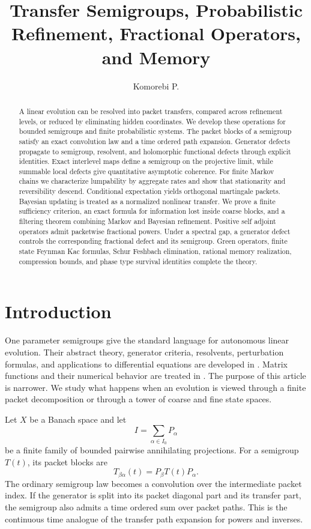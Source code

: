 \documentclass{aomart}
\title[Transfer semigroups and memory]{Transfer Semigroups, Probabilistic Refinement, Fractional Operators, and Memory}
\author[Komorebi P.]{Komorebi P.}
\theoremstyle{definition}
\theoremstyle{remark}
\begin{document}
\begin{abstract}
A linear evolution can be resolved into packet transfers, compared across refinement levels, or reduced by eliminating hidden coordinates. We develop these operations for bounded semigroups and finite probabilistic systems. The packet blocks of a semigroup satisfy an exact convolution law and a time ordered path expansion. Generator defects propagate to semigroup, resolvent, and holomorphic functional defects through explicit identities. Exact interlevel maps define a semigroup on the projective limit, while summable local defects give quantitative asymptotic coherence. For finite Markov chains we characterize lumpability by aggregate rates and show that stationarity and reversibility descend. Conditional expectation yields orthogonal martingale packets. Bayesian updating is treated as a normalized nonlinear transfer. We prove a finite sufficiency criterion, an exact formula for information lost inside coarse blocks, and a filtering theorem combining Markov and Bayesian refinement. Positive self adjoint operators admit packetwise fractional powers. Under a spectral gap, a generator defect controls the corresponding fractional defect and its semigroup. Green operators, finite state Feynman Kac formulas, Schur Feshbach elimination, rational memory realization, compression bounds, and phase type survival identities complete the theory.
\end{abstract}
\maketitle
\thispagestyle{plain}

\section{Introduction}\label{sec:introduction}

One parameter semigroups give the standard language for autonomous linear evolution. Their abstract theory, generator criteria, resolvents, perturbation formulas, and applications to differential equations are developed in \cite{HillePhillips1957,Pazy1983,EngelNagel2000}. Matrix functions and their numerical behavior are treated in \cite{Higham2008}. The purpose of this article is narrower. We study what happens when an evolution is viewed through a finite packet decomposition or through a tower of coarse and fine state spaces.

Let \(X\) be a Banach space and let
\[
I=\sum_{\alpha\in I_0}P_\alpha
\]
be a finite family of bounded pairwise annihilating projections. For a semigroup \(T(t)\), its packet blocks are
\[
T_{\beta\alpha}(t)=P_\beta T(t)P_\alpha.
\]
The ordinary semigroup law becomes a convolution over the intermediate packet index. If the generator is split into its packet diagonal part and its transfer part, the semigroup also admits a time ordered sum over packet paths. This is the continuous time analogue of the transfer path expansion for powers and inverses.
\end{document}
